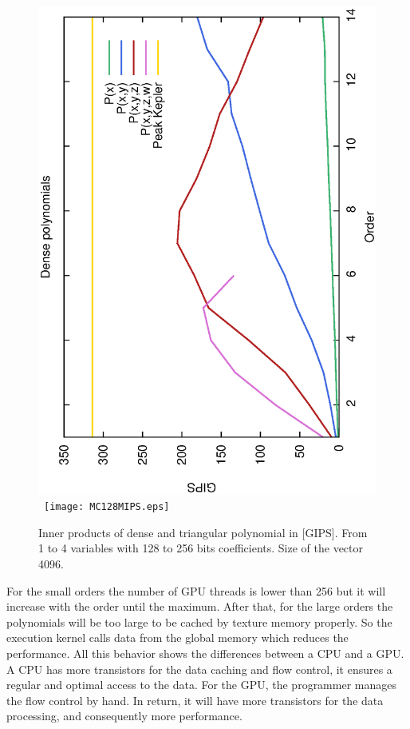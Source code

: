 \documentclass[oribibl]{llncs2e/llncs}
\begin{document}
\begin{figure}[t!]
\begin{center}
\mbox{
\hspace{-0.5cm}
\includegraphics[scale=0.37, angle=-90]{ME128MIPS.eps} 
\hspace{-0.4cm}
\texttt{[image: MC128MIPS.eps]} 
}
\caption{Inner products of  dense and triangular polynomial   in [GIPS]. From 1 to 4 variables with 128 to 256 bits coefficients. Size of the vector 4096.}
\label{ResMEMIPS}
\end{center}
\end{figure}  

For the small orders the number of GPU threads is lower than 256 but it will increase with the order until the maximum.
After that, for the large orders the polynomials will be too large to be cached by texture memory properly. So the execution kernel calls data from the global memory which reduces the performance.
 All this behavior shows the differences between a CPU and a GPU. A CPU has  more transistors for the  data caching and flow control, it ensures a regular and optimal access to the data. For the GPU,
 the programmer manages the flow control by hand. In return, it will have more transistors for the data processing, and consequently more performance.
\end{document}
